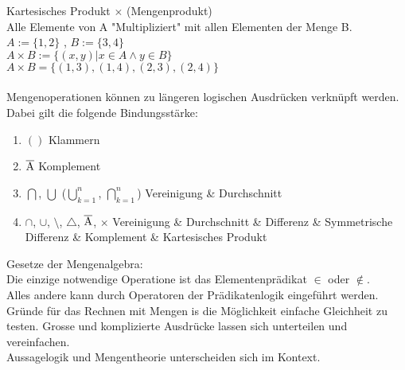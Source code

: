 \documentclass[../gruppenarbeit_1.tex]{subfiles}
\begin{document}
Kartesisches Produkt $\times$ (Mengenprodukt)\\
Alle Elemente von A "Multipliziert" mit allen Elementen der Menge B.\\
$A := \{1,2\}$ , $B := \{3,4\}$\\
$A \times B := \{(x,y) | x \in A \wedge y \in B\}$\\
$A \times B = \{(1,3),(1,4),(2,3),(2,4)\}$\\
\\

Mengenoperationen können zu längeren logischen Ausdrücken verknüpft werden.\\

Dabei gilt die folgende Bindungsstärke:

\begin{enumerate}
  \item $( )$ \hspace{15.5mm} Klammern
  \item $\overline{\rm A}$ \hspace{8mm} Komplement
  \item $\bigcap$, $\bigcup$ ($\bigcup \limits_{k=1}^n$, $\bigcap \limits_{k=1}^n$) \hspace{1mm} Vereinigung \& Durchschnitt
  \item $\cap$, $\cup$, $\setminus$, $\triangle$, $\overline{\rm A}$, $\times$ \hspace{8mm} Vereinigung \& Durchschnitt \& Differenz \& Symmetrische Differenz \& Komplement \& Kartesisches Produkt
\end{enumerate}


Gesetze der Mengenalgebra:\\
Die einzige notwendige Operatione ist das Elementenprädikat $\in$ oder $\notin$.\\
Alles andere kann durch Operatoren der Prädikatenlogik eingeführt werden.\\
Gründe für das Rechnen mit Mengen is die Möglichkeit einfache Gleichheit zu testen. Grosse und komplizierte Ausdrücke lassen sich unterteilen und vereinfachen.\\
Aussagelogik und Mengentheorie unterscheiden sich im Kontext.\\
\\
\end{document}
